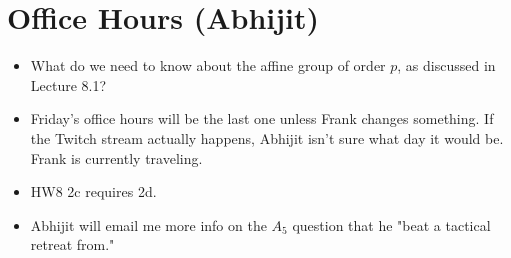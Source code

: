 \documentclass[../notes.tex]{subfiles}
\begin{document}
\section{Office Hours (Abhijit)}
\begin{itemize}
    \item What do we need to know about the affine group of order $p$, as discussed in Lecture 8.1?
    \item Friday's office hours will be the last one unless Frank changes something. If the Twitch stream actually happens, Abhijit isn't sure what day it would be. Frank is currently traveling.
    \item HW8 2c requires 2d.
    \item Abhijit will email me more info on the $A_5$ question that he "beat a tactical retreat from."
\end{itemize}
\end{document}
